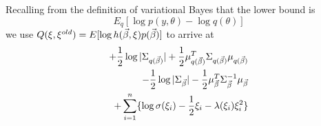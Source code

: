 \documentclass{amsart}
\begin{document}
Recalling from the definition of variational Bayes that the lower bound is
$$
E_q [\log p(y, \theta) - \log q(\theta)]
$$
we use $Q(\xi, \xi^{old}) = E [\log h(\vec{\beta}, \xi) p(\vec{\beta})]$ to arrive at
\begin{align*}
+ \frac{1}{2} \log |\Sigma_{q(\vec{\beta})}| + \frac{1}{2} \mu_{q(\vec{\beta})} ^T \Sigma_{q(\vec{\beta})} \mu_{q(\vec{\beta})} \\
- \frac{1}{2} \log |\Sigma_{\vec{\beta}}| - \frac{1}{2} \mu_{\vec{\beta}}^T \Sigma_{\vec{\beta}}^{-1} \mu_{\vec{\beta}} \\
+ \sum_{i=1}^{n} \{ \log \sigma(\xi_i) - \frac{1}{2} \xi_{i} - \lambda(\xi_{i}) \xi_{i}^2 \}
\end{align*}

\end{document}
